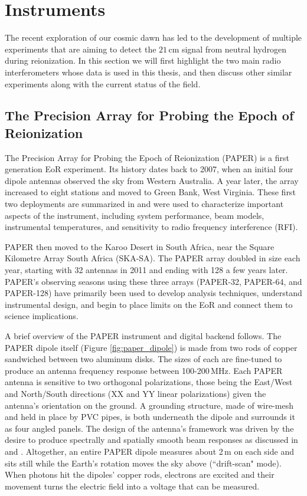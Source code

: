 \section{Instruments}

The recent exploration of our cosmic dawn has led to the development of multiple experiments that are aiming to detect the $21$\,cm signal from neutral hydrogen during reionization. In this section we will first highlight the two main radio interferometers whose data is used in this thesis, and then discuss other similar experiments along with the current status of the field.

\subsection{The Precision Array for Probing the Epoch of Reionization}

The Precision Array for Probing the Epoch of Reionization (PAPER) is a first generation EoR experiment. Its history dates back to 2007, when an initial four dipole antennas observed the sky from Western Australia. A year later, the array increased to eight stations and moved to Green Bank, West Virginia. These first two deployments are summarized in \citet{parsons_et_al2010} and were used to characterize important aspects of the instrument, including system performance, beam models, instrumental temperatures, and sensitivity to radio frequency interference (RFI). 

PAPER then moved to the Karoo Desert in South Africa, near the Square Kilometre Array South Africa (SKA-SA). The PAPER array doubled in size each year, starting with 32 antennas in 2011 and ending with 128 a few years later. PAPER's observing seasons using these three arrays (PAPER-32, PAPER-64, and PAPER-128) have primarily been used to develop analysis techniques, understand instrumental design, and begin to place limits on the EoR and connect them to science implications.

A brief overview of the PAPER instrument and digital backend follows. The PAPER dipole itself (Figure \ref{fig:paper_dipole}) is made from two rods of copper sandwiched between two aluminum disks. The sizes of each are fine-tuned to produce an antenna frequency response between 100-200\,MHz. Each PAPER antenna is sensitive to two orthogonal polarizations, those being the East/West and North/South directions (XX and YY linear polarizations) given the antenna's orientation on the ground. A grounding structure, made of wire-mesh and held in place by PVC pipes, is both underneath the dipole and surrounds it as four angled panels. The design of the antenna's framework was driven by the desire to produce spectrally and spatially smooth beam responses as discussed in \citet{parsons_et_al2010} and \citet{pober_et_al2012}. Altogether, an entire PAPER dipole measures about 2\,m on each side and sits still while the Earth's rotation moves the sky above (``drift-scan" mode). When photons hit the dipoles' copper rods, electrons are excited and their movement turns the electric field into a voltage that can be measured.

